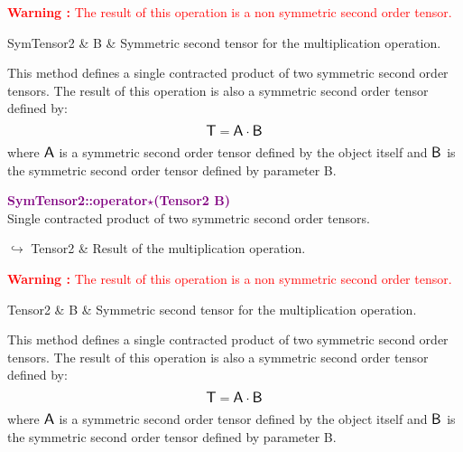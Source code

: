 \hspace*{10mm}\textcolor{red}{\textbf{Warning :}  The result of this operation is a non symmetric second order tensor.}

\begin{tcolorbox}[width=\textwidth,myArgs,tabularx={ll|R}]
SymTensor2 & B & Symmetric second tensor for the multiplication operation.
\end{tcolorbox}

This method defines a single contracted product of two symmetric second order tensors.
The result of this operation is also a symmetric second order tensor defined by:
\begin{equation*}
\mbox{\large\ensuremath{\mathsf{T}}} = \mbox{\large\ensuremath{\mathsf{A}}} \cdot \mbox{\large\ensuremath{\mathsf{B}}}
\end{equation*}
where $\mbox{\large\ensuremath{\mathsf{A}}}$ is a symmetric second order tensor defined by the object itself and $\mbox{\large\ensuremath{\mathsf{B}}}$ is the symmetric second order tensor defined by parameter B.

\textcolor{purple}{\textbf{SymTensor2::operator$\star$(Tensor2 B)}}\label{SymTensor2::operator*(Tensor2 B)}\\
Single contracted product of two symmetric second order tensors.\vspace*{-0.5em}
\begin{tcolorbox}[grow to left by=-1cm, width=\textwidth-1cm,myArgs,tabularx={l|R}]
$\hookrightarrow$ Tensor2 & Result of the multiplication operation.
\end{tcolorbox}

\hspace*{10mm}\textcolor{red}{\textbf{Warning :}  The result of this operation is a non symmetric second order tensor.}

\begin{tcolorbox}[width=\textwidth,myArgs,tabularx={ll|R}]
Tensor2 & B & Symmetric second tensor for the multiplication operation.
\end{tcolorbox}

This method defines a single contracted product of two symmetric second order tensors.
The result of this operation is also a symmetric second order tensor defined by:
\begin{equation*}
\mbox{\large\ensuremath{\mathsf{T}}} = \mbox{\large\ensuremath{\mathsf{A}}} \cdot \mbox{\large\ensuremath{\mathsf{B}}}
\end{equation*}
where $\mbox{\large\ensuremath{\mathsf{A}}}$ is a symmetric second order tensor defined by the object itself and $\mbox{\large\ensuremath{\mathsf{B}}}$ is the symmetric second order tensor defined by parameter B.

